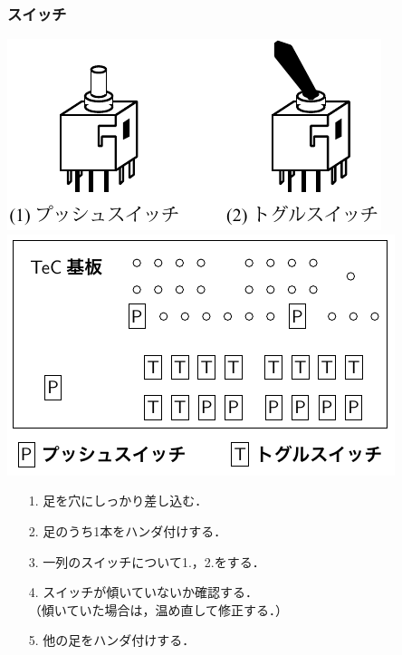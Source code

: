 \documentclass{beamer}                 %
\begin{document}
\begin{frame}
  \frametitle{スイッチ}
  \vfill
  \centerline{\includegraphics[scale=0.65]{../chap3/sw.pdf}\hspace{1cm}
    \includegraphics[scale=0.8]{../Tikz/sws.pdf}}
  \vfill
  \begin{enumerate}
  \item[1.] 足を穴にしっかり差し込む．
  \item[2.] 足のうち1本をハンダ付けする．
  \item[3.] 一列のスイッチについて1.，2.をする．
  \item[4.] スイッチが傾いていないか確認する．\\
    （傾いていた場合は，温め直して修正する．）
  \item[5.] 他の足をハンダ付けする．
  \end{enumerate}
  \vfill
\end{frame}
\end{document}

